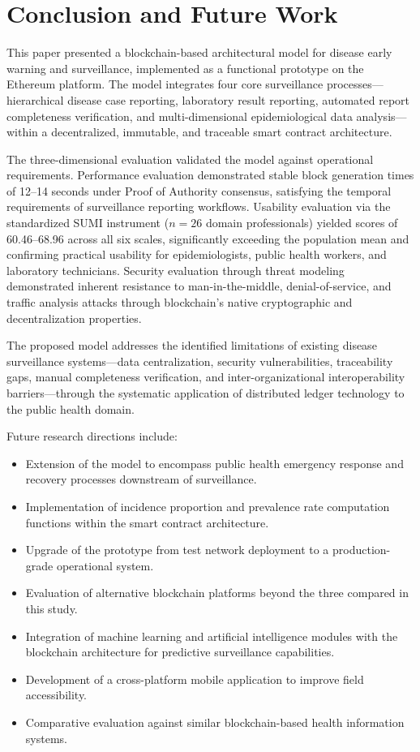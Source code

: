 \documentclass[AMA,LATO1COL]{WileyNJD-v2}
\begin{document}
\section{Conclusion and Future Work}\label{sec:conclusion}

This paper presented a blockchain-based architectural model for disease early warning and surveillance, implemented as a functional prototype on the Ethereum platform. The model integrates four core surveillance processes---hierarchical disease case reporting, laboratory result reporting, automated report completeness verification, and multi-dimensional epidemiological data analysis---within a decentralized, immutable, and traceable smart contract architecture.

The three-dimensional evaluation validated the model against operational requirements. Performance evaluation demonstrated stable block generation times of 12--14 seconds under Proof of Authority consensus, satisfying the temporal requirements of surveillance reporting workflows. Usability evaluation via the standardized SUMI instrument ($n=26$ domain professionals) yielded scores of 60.46--68.96 across all six scales, significantly exceeding the population mean and confirming practical usability for epidemiologists, public health workers, and laboratory technicians. Security evaluation through threat modeling demonstrated inherent resistance to man-in-the-middle, denial-of-service, and traffic analysis attacks through blockchain's native cryptographic and decentralization properties.

The proposed model addresses the identified limitations of existing disease surveillance systems---data centralization, security vulnerabilities, traceability gaps, manual completeness verification, and inter-organizational interoperability barriers---through the systematic application of distributed ledger technology to the public health domain.

Future research directions include:
\begin{itemize}
\item Extension of the model to encompass public health emergency response and recovery processes downstream of surveillance.
\item Implementation of incidence proportion and prevalence rate computation functions within the smart contract architecture.
\item Upgrade of the prototype from test network deployment to a production-grade operational system.
\item Evaluation of alternative blockchain platforms beyond the three compared in this study.
\item Integration of machine learning and artificial intelligence modules with the blockchain architecture for predictive surveillance capabilities.
\item Development of a cross-platform mobile application to improve field accessibility.
\item Comparative evaluation against similar blockchain-based health information systems.
\end{itemize}
\end{document}
